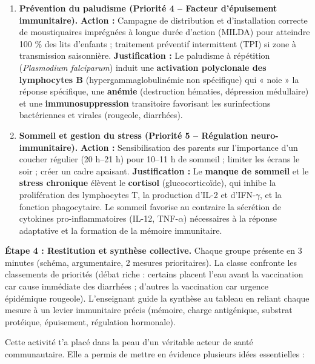 \documentclass[11pt]{article}
\newcounter{popsec}
\newcounter{popsub}
\newcommand{\courssub}[1]{%
  \stepcounter{popsub}%
  \par\vspace{9pt}\noindent{\popxbold\fontsize{11.5}{13}\selectfont\color{popink}{\color{poporange}\thepopsec.\thepopsub}\hspace{6pt}#1}\par\nopagebreak\vspace{4pt}
}
\begin{document}
\begin{exoresolu}
\begin{enumerate}
\item \textbf{Prévention du paludisme (Priorité 4 -- Facteur d'épuisement immunitaire).} \textbf{Action :} Campagne de distribution et d'installation correcte de moustiquaires imprégnées à longue durée d'action (MILDA) pour atteindre 100 \% des lits d'enfants ; traitement préventif intermittent (TPI) si zone à transmission saisonnière. \textbf{Justification :} Le paludisme à répétition (\emph{Plasmodium falciparum}) induit une \textbf{activation polyclonale des lymphocytes B} (hypergammaglobulinémie non spécifique) qui « noie » la réponse spécifique, une \textbf{anémie} (destruction hématies, dépression médullaire) et une \textbf{immunosuppression} transitoire favorisant les surinfections bactériennes et virales (rougeole, diarrhées).
\item \textbf{Sommeil et gestion du stress (Priorité 5 -- Régulation neuro-immunitaire).} \textbf{Action :} Sensibilisation des parents sur l'importance d'un coucher régulier (20 h--21 h) pour 10--11 h de sommeil ; limiter les écrans le soir ; créer un cadre apaisant. \textbf{Justification :} Le \textbf{manque de sommeil} et le \textbf{stress chronique} élèvent le \textbf{cortisol} (glucocorticoïde), qui inhibe la prolifération des lymphocytes T, la production d'IL-2 et d'IFN-$\gamma$, et la fonction phagocytaire. Le sommeil favorise au contraire la sécrétion de cytokines pro-inflammatoires (IL-12, TNF-$\alpha$) nécessaires à la réponse adaptative et la formation de la mémoire immunitaire.
\end{enumerate}

\textbf{Étape 4 : Restitution et synthèse collective.} Chaque groupe présente en 3 minutes (schéma, argumentaire, 2 mesures prioritaires). La classe confronte les classements de priorités (débat riche : certains placent l'eau avant la vaccination car cause immédiate des diarrhées ; d'autres la vaccination car urgence épidémique rougeole). L'enseignant guide la synthèse au tableau en reliant chaque mesure à un levier immunitaire précis (mémoire, charge antigénique, substrat protéique, épuisement, régulation hormonale).

\end{exoresolu}

\courssub{Bilan de l'activité}

Cette activité t'a placé dans la peau d'un véritable acteur de santé communautaire. Elle a permis de mettre en évidence plusieurs idées essentielles :
\end{document}
